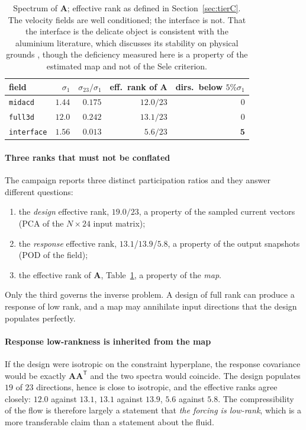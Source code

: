 \documentclass[11pt,a4paper]{article}
\newcommand{\vect}[1]{\mathbf{#1}}
\theoremstyle{plain}
\theoremstyle{definition}
\theoremstyle{remark}
\begin{document}
\begin{table}[t]
\centering
\small
\begin{tabular}{@{}lrrrr@{}}
\toprule
field & $\sigma_1$ & $\sigma_{23}/\sigma_1$ & eff.\ rank of $\vect{A}$ & dirs.\ below $5\%\sigma_1$ \\
\midrule
\texttt{midacd}    & $1.44$  & $0.175$ & $12.0/23$ & $0$ \\
\texttt{full3d}    & $12.0$  & $0.242$ & $13.1/23$ & $0$ \\
\texttt{interface} & $1.56$  & $\mathbf{0.013}$ & $5.6/23$ & $\mathbf{5}$ \\
\bottomrule
\end{tabular}
\caption{Spectrum of $\vect{A}$; effective rank as defined in
Section~\ref{sec:tierC}.
The velocity fields are well conditioned; the interface is not. That the
interface is the delicate object is consistent with the aluminium literature,
which discusses its stability on physical grounds \cite{sele,bojarevics}, though
the deficiency measured here is a property of the estimated map and not of the
Sele criterion.}
\label{tab:spectrum}
\end{table}

\label{rem:three-ranks}
\paragraph{Three ranks that must not be conflated}
The campaign reports three distinct participation ratios and they answer
different questions:
\begin{enumerate}
\item the \emph{design} effective rank, $19.0/23$, a property of the sampled
current vectors (PCA of the $N\times24$ input matrix);
\item the \emph{response} effective rank, $13.1$/$13.9$/$5.8$, a property of the
output snapshots (POD of the field);
\item the effective rank of $\vect{A}$, Table~\ref{tab:spectrum}, a property of
the \emph{map}.
\end{enumerate}
Only the third governs the inverse problem. A design of full rank can produce a
response of low rank, and a map may annihilate input directions that the design
populates perfectly.

\label{rem:inherit}
\paragraph{Response low-rankness is inherited from the map}
If the design were isotropic on the constraint hyperplane, the response
covariance would be exactly $\vect{A}\vect{A}^{\mathsf{T}}$ and the two spectra
would coincide. The design populates $19$ of $23$ directions, hence is close to
isotropic, and the effective ranks agree closely: $12.0$ against $13.1$,
$13.1$ against $13.9$, $5.6$ against $5.8$. The compressibility of the flow is
therefore largely a statement that \emph{the forcing is low-rank}, which is a
more transferable claim than a statement about the fluid.
\end{document}
